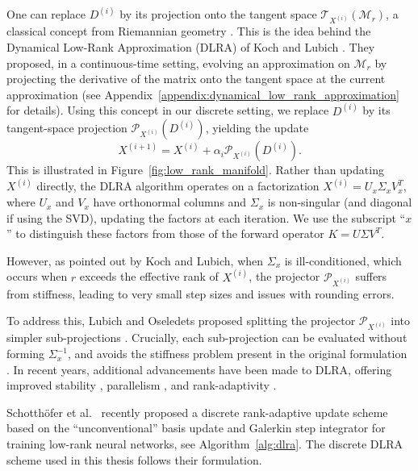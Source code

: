 One can replace $D^{(i)}$ by its projection onto the tangent space $\mathcal{T}_{X^{(i)}}(\mathcal{M}_r)$, a classical concept from Riemannian geometry \cite{docarmoRiemannianGeometry1992,absilOptimizationAlgorithmsMatrix2008}. This is the idea behind the Dynamical Low-Rank Approximation (DLRA) of Koch and Lubich \cite{kochDynamicalLowrankApproximation2007}. They proposed, in a continuous-time setting, evolving an approximation on $\mathcal{M}_r$ by projecting the derivative of the matrix onto the tangent space at the current approximation (see Appendix~\ref{appendix:dynamical_low_rank_approximation} for details). Using this concept in our discrete setting, we replace $D^{(i)}$ by its tangent-space projection $\mathcal{P}_{X^{(i)}}(D^{(i)})$, yielding the update
\begin{equation*}
    X^{(i+1)} = X^{(i)} 
    + \alpha_i \mathcal{P}_{X^{(i)}}(D^{(i)}).
\end{equation*}
This is illustrated in Figure~\ref{fig:low_rank_manifold}. Rather than updating $X^{(i)}$ directly, the DLRA algorithm operates on a factorization $X^{(i)} = U_x \Sigma_x V_x^T$, where $U_x$ and $V_x$ have orthonormal columns and $\Sigma_x$ is non-singular (and diagonal if using the SVD), updating the factors at each iteration. We use the subscript ``$x$'' to distinguish these factors from those of the forward operator $K = U \Sigma V^T$.

However, as pointed out by Koch and Lubich, when $\Sigma_x$ is ill-conditioned, which occurs when $r$ exceeds the effective rank of $X^{(i)}$, the projector $\mathcal{P}_{X^{(i)}}$ suffers from stiffness, leading to very small step sizes and issues with rounding errors.

To address this, Lubich and Oseledets proposed splitting the projector $\mathcal{P}_{X^{(i)}}$ into simpler sub-projections \cite{lubichProjectorsplittingIntegratorDynamical2013}. Crucially, each sub-projection can be evaluated without forming $\Sigma_x^{-1}$, and avoids the stiffness problem present in the original formulation \cite{kieriDiscretizedDynamicalLowrank2016}. In recent years, additional advancements have been made to DLRA, offering improved stability \cite{kuschStabilityRobustDynamical2023a}, parallelism \cite{cerutiParallelRankadaptiveIntegrator2024}, and rank-adaptivity \cite{cerutiRankadaptiveRobustIntegrator2021}.

Schotthöfer et al.\ \cite{schotthoferLowrankLotteryTickets2022} recently proposed a discrete rank-adaptive update scheme based on the ``unconventional'' basis update and Galerkin step integrator \cite{cerutiUnconventionalRobustIntegrator2020} for training low-rank neural networks, see Algorithm~\ref{alg:dlra}. The discrete DLRA scheme used in this thesis follows their formulation.


